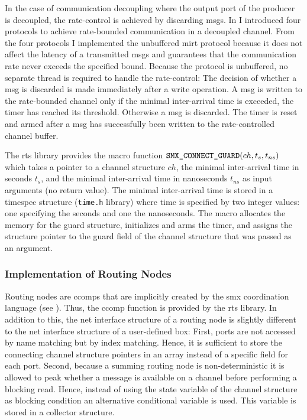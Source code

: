 In the case of communication decoupling where the output port of the producer is decoupled, the rate-control is achieved by discarding \glspl*{msg}.
In \Sect{\ref{sect_cci_decoupling_rate}} I introduced four protocols to achieve rate-bounded communication in a decoupled channel.
From the four protocols I implemented the unbuffered \gls{mirt} protocol because it does not affect the latency of a transmitted \glspl*{msg} and guarantees that the communication rate never exceeds the specified bound.
Because the protocol is unbuffered, no separate thread is required to handle the rate-control:
The decision of whether a \gls*{msg} is discarded is made immediately after a write operation.
A \gls*{msg} is written to the rate-bounded channel only if the minimal inter-arrival time is exceeded, \ie the timer has reached its threshold.
Otherwise a \gls*{msg} is discarded.
The timer is reset and armed after a \gls*{msg} has successfully been written to the rate-controlled channel buffer.

The \gls{rts} library provides the macro function $\textnormal{\tt SMX\_CONNECT\_GUARD}(ch, t_{s}, t_{ns})$ which takes a pointer to a channel structure $ch$, the minimal inter-arrival time in seconds $t_s$, and the minimal inter-arrival time in nanoseconds $t_{ns}$ as input arguments (no return value).
The minimal inter-arrival time is stored in a timespec structure (\texttt{time.h} library) where time is specified by two integer values: one specifying the seconds and one the nanoseconds.
The macro allocates the memory for the guard structure, initializes and arms the timer, and assigns the structure pointer to the guard field of the channel structure that was passed as an argument.

\subsubsection{Implementation of Routing Nodes}
\label{sect_tool_rts_ch_cflow}
Routing nodes are \glspl*{ccomp} that are implicitly created by the \gls*{smx} coordination language (see \Sect{\ref{sect_smx_box_implicit_flow}}).
Thus, the \gls*{ccomp} function is provided by the \gls{rts} library.
In addition to this, the net interface structure of a routing node is slightly different to the net interface structure of a user-defined box:
First, ports are not accessed by name matching but by index matching.
Hence, it is sufficient to store the connecting channel structure pointers in an array instead of a specific field for each port.
Second, because a summing routing node is non-deterministic it is allowed to peak whether a message is available on a channel before performing a blocking read.
Hence, instead of using the state variable of the channel structure as blocking condition an alternative conditional variable is used.
This variable is stored in a collector structure.

